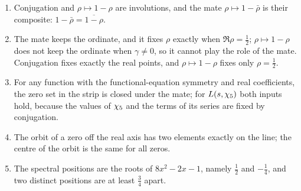 \begin{proposition}\label{prop:klein-detail}
\begin{enumerate}[label=\textup{(\roman*)}]
  \item Conjugation and $\rho\mapsto1-\rho$ are involutions, and the mate
    $\rho\mapsto1-\bar\rho$ is their composite: $1-\bar\rho=\overline{1-\rho}$.
  \item The mate keeps the ordinate, and it fixes $\rho$ exactly when $\Re\rho=\tfrac12$;
    $\rho\mapsto1-\rho$ does not keep the ordinate when $\gamma\ne0$, so it cannot play the
    role of the mate.  Conjugation fixes exactly the real points, and $\rho\mapsto1-\rho$
    fixes only $\rho=\tfrac12$.
  \item For any function with the functional-equation symmetry and real coefficients,
    the zero set in the strip is closed under the mate; for $L(s,\chi_5)$ both inputs
    hold, because the values of $\chi_5$ and the terms of its series are fixed by
    conjugation.
  \item The orbit of a zero off the real axis has two elements exactly on the line;
    the centre of the orbit is the same for all zeros.
  \item The spectral positions are the roots of $8x^2-2x-1$, namely $\tfrac12$ and
    $-\tfrac14$, and two distinct positions are at least $\tfrac34$ apart.
\end{enumerate}
%
\end{proposition}

